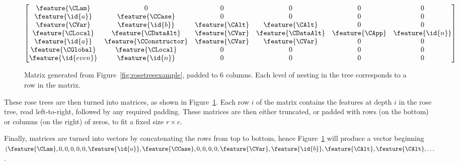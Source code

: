 \begin{figure}
    \begin{equation*}
      \begin{bmatrix}
        \feature{\CLam}      & 0                       & 0                 & 0                   & 0               & 0                \\
        \feature{\id{a}}     & \feature{\CCase}        & 0                 & 0                   & 0               & 0                \\
        \feature{\CVar}      & \feature{\id{b}}        & \feature{\CAlt}   & \feature{\CAlt}     & 0               & 0                \\
        \feature{\CLocal}    & \feature{\CDataAlt}     & \feature{\CVar}   & \feature{\CDataAlt} & \feature{\CApp} & \feature{\id{n}} \\
        \feature{\id{a}}     & \feature{\CConstructor} & \feature{\CVar}   & \feature{\CVar}     & 0               & 0                \\
        \feature{\CGlobal}   & \feature{\CLocal}       & 0                 & 0                   & 0               & 0                \\
        \feature{\id{even}}  & \feature{\id{n}}        & 0                 & 0                   & 0               & 0
      \end{bmatrix}
    \end{equation*}
    \caption{Matrix generated from Figure~\ref{fig:rosetreeexample}, padded to 6 columns. Each level of nesting in the tree corresponds to a row in the matrix.}
    \label{fig:matrixexample}
\end{figure}

These rose trees are then turned into matrices, as shown in
Figure~\ref{fig:matrixexample}. Each row $i$ of the matrix contains the features
at depth $i$ in the rose tree, read left-to-right, followed by any required
padding. These matrices are then either truncated, or padded with rows (on the
bottom) or columns (on the right) of zeros, to fit a fixed size $r \times c$.

\begin{sloppypar}
  Finally, matrices are turned into vectors by concatenating the rows from top
  to bottom, hence Figure~\ref{fig:matrixexample} will produce a vector
  beginning
  $(\feature{\CLam} ,
    0               ,
    0               ,
    0               ,
    0               ,
    0               ,
    \feature{\id{a}},
    \feature{\CCase},
    0               ,
    0               ,
    0               ,
    0               ,
    \feature{\CVar} ,
    \feature{\id{b}},
    \feature{\CAlt} ,
    \feature{\CAlt} ,
    \dots$.
\end{sloppypar}

